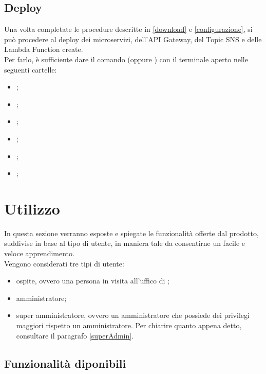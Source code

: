 
\subsection{Deploy}
Una volta completate le procedure descritte in \ref{download} e \ref{configurazione}, si può procedere al deploy dei microservizi, dell'API Gateway, del Topic SNS e delle Lambda Function create.\\
Per farlo, è sufficiente dare il comando  (oppure ) con il terminale aperto nelle seguenti cartelle:
\begin{itemize}
	\item {};
	\item {};
	\item {};
	\item {};
	\item {};
	\item {};
\end{itemize}

\newpage
\section{Utilizzo}
In questa sezione verranno esposte e spiegate le funzionalità offerte dal prodotto, suddivise in base al tipo di utente, in maniera tale da consentirne un facile e veloce apprendimento. \\
Vengono considerati tre tipi di utente:
\begin{itemize}
	\item ospite, ovvero una persona in visita all'uffico di \PROPONENTE;
	\item amministratore;
	\item super amministratore, ovvero un amministratore che possiede dei privilegi maggiori rispetto un amministratore. Per chiarire quanto appena detto, consultare il paragrafo \ref{superAdmin}.
\end{itemize}
 
\subsection{Funzionalità diponibili}\label{funz}
